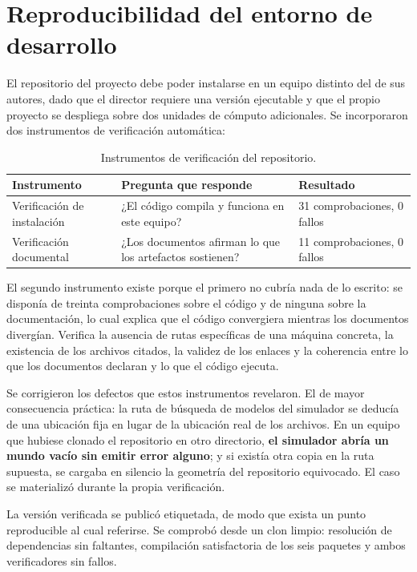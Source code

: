 \documentclass[12pt,letterpaper]{article}
\begin{document}
\section{Reproducibilidad del entorno de desarrollo}

El repositorio del proyecto debe poder instalarse en un equipo distinto del de sus autores, dado que el director requiere una versión ejecutable y que el propio proyecto se despliega sobre dos unidades de cómputo adicionales. Se incorporaron dos instrumentos de verificación automática:

\begin{table}[H]
    \centering
    \small
    \caption{Instrumentos de verificación del repositorio.}
    \label{tab:verificadores}
    \begin{tabular}{@{}p{4.6cm}p{4.3cm}p{4.4cm}@{}}
        \toprule
        \textbf{Instrumento} & \textbf{Pregunta que responde} & \textbf{Resultado} \\ \midrule
        Verificación de instalación & ¿El código compila y funciona en este equipo? & 31 comprobaciones, 0 fallos \\ \addlinespace
        Verificación documental & ¿Los documentos afirman lo que los artefactos sostienen? & 11 comprobaciones, 0 fallos \\ \bottomrule
    \end{tabular}
\end{table}

El segundo instrumento existe porque el primero no cubría nada de lo escrito: se disponía de treinta comprobaciones sobre el código y de ninguna sobre la documentación, lo cual explica que el código convergiera mientras los documentos divergían. Verifica la ausencia de rutas específicas de una máquina concreta, la existencia de los archivos citados, la validez de los enlaces y la coherencia entre lo que los documentos declaran y lo que el código ejecuta.

Se corrigieron los defectos que estos instrumentos revelaron. El de mayor consecuencia práctica: la ruta de búsqueda de modelos del simulador se deducía de una ubicación fija en lugar de la ubicación real de los archivos. En un equipo que hubiese clonado el repositorio en otro directorio, \textbf{el simulador abría un mundo vacío sin emitir error alguno}; y si existía otra copia en la ruta supuesta, se cargaba en silencio la geometría del repositorio equivocado. El caso se materializó durante la propia verificación.

La versión verificada se publicó etiquetada, de modo que exista un punto reproducible al cual referirse. Se comprobó desde un clon limpio: resolución de dependencias sin faltantes, compilación satisfactoria de los seis paquetes y ambos verificadores sin fallos.
\end{document}
